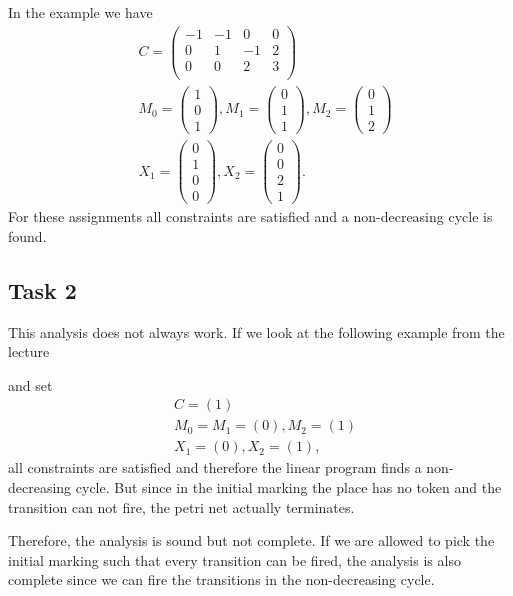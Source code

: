 In the example we have
\begin{align*}
&C = \begin{pmatrix}
-1 & -1 & 0 & 0\\
0 & 1 & -1 & 2\\
0 & 0 & 2 & 3\\
\end{pmatrix}\\
&M_0 = \begin{pmatrix} 1 \\ 0 \\ 1 \end{pmatrix},
M_1 = \begin{pmatrix} 0 \\ 1 \\ 1 \end{pmatrix},
M_2 = \begin{pmatrix} 0 \\ 1 \\ 2 \end{pmatrix}\\
&X_1 = \begin{pmatrix} 0 \\ 1 \\ 0 \\ 0 \end{pmatrix},
X_2 = \begin{pmatrix} 0 \\ 0 \\ 2 \\ 1 \end{pmatrix}.
\end{align*}
For these assignments all constraints are satisfied and a non-decreasing cycle is found.

\subsection{Task 2}
This analysis does not always work. If we look at the following example from the lecture
\begin{center}\end{center}
and set
\begin{align*}
&C = (1)\\
&M_0 = M_1 = (0), M_2 = (1)\\
&X_1 = (0), X_2 = (1),
\end{align*}
all constraints are satisfied and therefore the linear program finds a non-decreasing cycle. But since in the initial marking the place has no token and the transition can not fire, the petri net actually terminates.

Therefore, the analysis is sound but not complete. If we are allowed to pick the initial marking such that every transition can be fired, the analysis is also complete since we can fire the transitions in the non-decreasing cycle. 